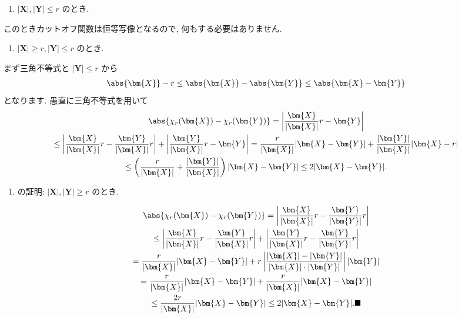 \documentclass[openany, a4paper, oneside]{jsbook}
\begin{document}
\begin{enumerate}
\item $| \bm{X} | , | \bm{Y} | \leq r$ のとき.
\end{enumerate}

このときカットオフ関数は恒等写像となるので, 何もする必要はありません.

\begin{enumerate}
\item $| \bm{X} | \geq r , | \bm{Y} | \leq r$ のとき.
\end{enumerate}

まず三角不等式と $|\bm{Y}| \leq r$ から
\begin{gather}
\abs{\bm{X}} - r
\leq
\abs{\bm{X}} - \abs{\bm{Y}}
\leq
\abs{\bm{X} - \bm{Y}}
\end{gather}
となります.
愚直に三角不等式を用いて
\begin{gather}
\abs{\chi_r (\bm{X}) - \chi_r ( \bm{Y} )}
=
\left| \frac{ \bm{X} } { | \bm{X} | } r - \bm{Y} \right| \\
\leq
\left| \frac{ \bm{X} } { | \bm{X} | } r - \frac{ \bm{Y} } { | \bm{X} | } r \right|
+\left| \frac{ \bm{Y} } { | \bm{X} | } r - \bm{Y} \right|
=
\frac{r} { | \bm{X} | } | \bm{X} - \bm{Y} | + \frac{ | \bm{Y} | } { | \bm{X} | } | \bm{X} - r  | \\
\leq
\left ( \frac{r} { | \bm{X} | } + \frac{ | \bm{Y} | } { | \bm{X} | } \right) | \bm{X} - \bm{Y} |
\leq
2 | \bm{X} - \bm{Y} | .
\end{gather}

\begin{enumerate}
\item の証明: $|\bm{X}| , | \bm{Y} | \geq r$ のとき.
\end{enumerate}

\begin{gather}
\abs{\chi_r (\bm{X}) - \chi_r ( \bm{Y} )}
=
\left| \frac{ \bm{X} } { | \bm{X} | } r - \frac{ \bm{Y} } { | \bm{Y} | } r \right| \\
\leq
\left| \frac{ \bm{X} } { | \bm{X} | } r - \frac{ \bm{Y} } { | \bm{X} | } r \right|
+\left| \frac{ \bm{Y} } { | \bm{X} | } r - \frac{ \bm{Y} } { | \bm{Y} | } r \right| \\
=
\frac{r} { | \bm{X} | } | \bm{X} - \bm{Y} |
+r \left| \frac{ | \bm{X} | - | \bm{Y} | } { | \bm{X} | \cdot | \bm{Y} | } \right| | \bm{Y} | \\
=
\frac{r} { | \bm{X} | } | \bm{X} - \bm{Y} | + \frac{ r } { | \bm{X} | } | \bm{X} - \bm{Y} | \\
\leq
\frac{ 2r } { | \bm{X} | } | \bm{X} - \bm{Y} |
\leq
2 | \bm{X} - \bm{Y} | .\blacksquare
\end{gather}
\end{document}
